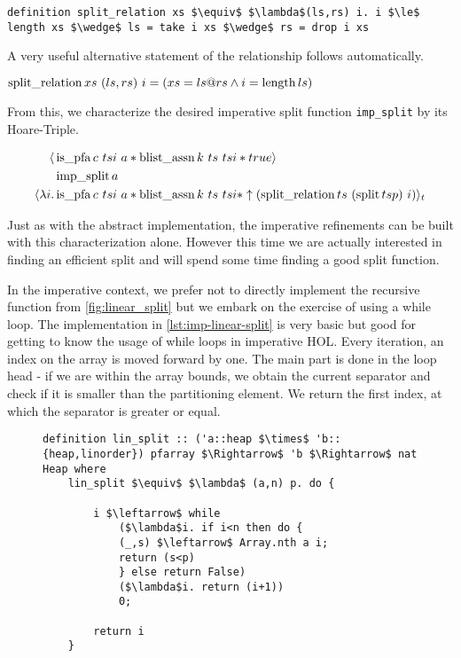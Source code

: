 \begin{lstlisting}[mathescape=true, language=Isabelle]
definition split_relation xs $\equiv$ $\lambda$(ls,rs) i. i $\le$ length xs $\wedge$ ls = take i xs $\wedge$ rs = drop i xs
\end{lstlisting}

A very useful alternative statement of the relationship follows automatically.

\begin{lemma}
    $\operatorname{split\_relation} xs\ (ls,rs)\ i = (xs = ls@rs \wedge i = \operatorname{length} ls)$
\end{lemma}

From this, we characterize the desired imperative
split function \texttt{imp\_split} by its Hoare-Triple.

\begin{align*}
    \langle & \operatorname{is\_pfa} c\ tsi\ a * \operatorname{blist\_assn} k\ ts\ tsi *  true \rangle \\
            & \operatorname{imp\_split} a \\
\langle\lambda i. & \operatorname{is\_pfa} c\ tsi\ a * \operatorname{blist\_assn} k\ ts\ tsi * \uparrow(\operatorname{split\_relation} ts\ (\operatorname{split} ts p)\ i)\rangle_t
\end{align*}

Just as with the abstract implementation,
the imperative refinements can be built with this characterization alone.
However this time we are actually interested in finding an
efficient split and will spend some time finding
a good split function.

In the imperative context, we prefer not to directly
implement the recursive function from \autoref{fig:linear_split}
but we embark on the exercise of using a while loop.
The implementation in \autoref{lst:imp-linear-split}
is very basic but good for getting to know
the usage of while loops in imperative HOL.
Every iteration, an index on the array is moved forward by one.
The main part is done in the loop head - if we
are within the array bounds,
we obtain the current separator and check if it is
smaller than the partitioning element.
We return the first index, at which the separator is greater or equal.

\begin{figure}
\begin{lstlisting}[mathescape=true, language=Isabelle, caption={The imperative linear split},
    label={lst:imp-linear-split}]
definition lin_split :: ('a::heap $\times$ 'b::{heap,linorder}) pfarray $\Rightarrow$ 'b $\Rightarrow$ nat Heap where
    lin_split $\equiv$ $\lambda$ (a,n) p. do { 
   
        i $\leftarrow$ while  
            ($\lambda$i. if i<n then do { 
            (_,s) $\leftarrow$ Array.nth a i; 
            return (s<p) 
            } else return False)  
            ($\lambda$i. return (i+1))  
            0; 
                
        return i 
    }
\end{lstlisting}
\end{figure}


